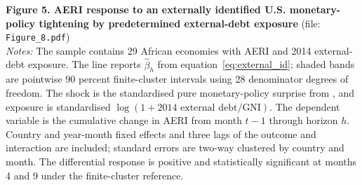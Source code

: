 \noindent\textbf{Figure 5. AERI response to an externally identified U.S. monetary-policy tightening by predetermined external-debt exposure} (file: \texttt{Figure\_8.pdf})\\
\textit{Notes:} The sample contains 29 African economies with AERI and 2014 external-debt exposure. The line reports $\hat\beta_h$ from equation~\eqref{eq:external_id}; shaded bands are pointwise 90 percent finite-cluster intervals using 28 denominator degrees of freedom. The shock is the standardised pure monetary-policy surprise from \citet{jarocinski2020}, and exposure is standardised $\log(1+\text{2014 external debt/GNI})$. The dependent variable is the cumulative change in AERI from month $t-1$ through horizon $h$. Country and year-month fixed effects and three lags of the outcome and interaction are included; standard errors are two-way clustered by country and month. The differential response is positive and statistically significant at months 4 and 9 under the finite-cluster reference.\par\medskip

